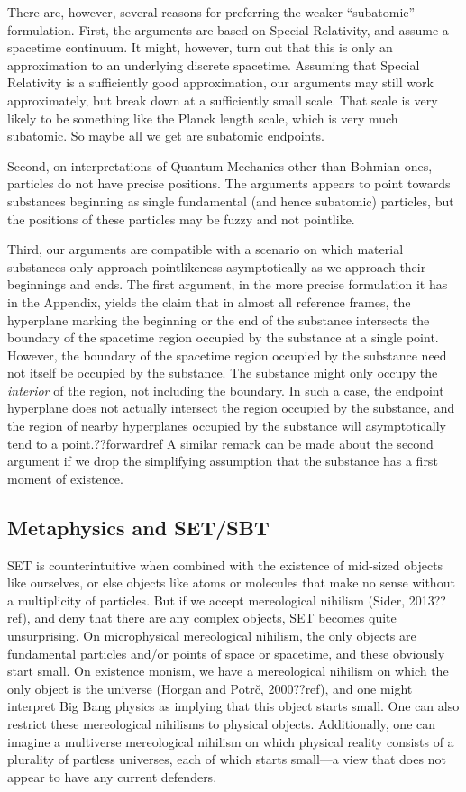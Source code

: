 There are, however, several reasons for preferring the weaker ``subatomic'' formulation. First, the arguments are based
on Special Relativity, and assume a spacetime continuum. It might, however, turn out that this is only an approximation 
to an underlying discrete spacetime. Assuming that Special Relativity is a sufficiently good approximation, our arguments may 
still work approximately, but break down at a sufficiently small scale. That scale is very likely to be something like the 
Planck length scale, which is very much subatomic. So maybe all we get are subatomic endpoints.

Second, on interpretations of Quantum Mechanics other than Bohmian ones, particles do not have precise positions. The arguments 
appears to point towards substances beginning as single fundamental (and hence subatomic) particles, but the positions of these
particles may be fuzzy and not pointlike. 

Third, our arguments are compatible with a scenario on which material substances only approach pointlikeness asymptotically
as we approach their beginnings and ends. The first argument, in the more precise formulation it has in the 
Appendix, yields the claim that in almost all reference frames, the hyperplane marking the beginning or the end of the 
substance intersects the boundary of the spacetime region occupied by the substance at a single point. However, the boundary
of the spacetime region occupied by the substance need not itself be occupied by the substance. The substance might only 
occupy the \textit{interior} of the region, not including the boundary. In such a case, the endpoint hyperplane does not actually
intersect the region occupied by the substance, and the region of nearby hyperplanes occupied by the substance will asymptotically
tend to a point.??forwardref  A similar remark can be made about the second argument if we drop the simplifying assumption that
the substance has a first moment of existence.

\subsection{Metaphysics and SET/SBT}
SET is counterintuitive when combined with the existence of mid-sized objects like ourselves, or else objects like atoms or molecules that make no sense without a multiplicity of particles.  But if we accept mereological nihilism (Sider, 2013??ref), and deny that there are any complex objects, SET becomes quite unsurprising. On microphysical mereological nihilism, the only objects are fundamental particles and/or points of space or spacetime, and these obviously start small. On existence monism, we have a mereological nihilism on which the only object is the universe (Horgan and Potr\v{c}, 2000??ref), and one might interpret Big Bang physics as implying that this object starts small. One can also restrict these mereological nihilisms to physical objects. Additionally, one can imagine a multiverse mereological nihilism on which physical reality consists of a plurality of partless universes, each of which starts small---a view that does not appear to have any current defenders.

